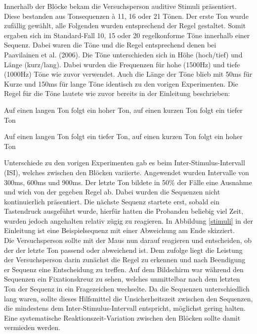 \documentclass[doc,a4paper,12pt]{apa6}
\begin{document}
Innerhalb der Blöcke bekam die Versuchsperson auditive Stimuli präsentiert. Diese bestanden aus Tonsequenzen à 11, 16 oder 21 Tönen. Der erste Ton wurde zufällig gewählt, alle Folgenden wurden entsprechend der Regel gestaltet. Somit ergaben sich im Standard-Fall 10, 15 oder 20 regelkonforme Töne innerhalb einer Sequenz. Dabei waren die Töne und die Regel entsprechend denen bei Paavilainen et al. (2006). Die Töne unterschieden sich in Höhe (hoch/tief) und Länge (kurz/lang). Dabei wurden die Frequenzen für hohe (1500Hz) und tiefe (1000Hz) Töne wie zuvor verwendet. Auch die Länge der Töne blieb mit 50ms für Kurze und 150ms für lange Töne identisch zu den vorigen Experimenten. Die Regel für die Töne lautete wie zuvor bereits in der Einleitung beschrieben:

\begin{compactitem}
  \item Auf einen langen Ton folgt ein hoher Ton, auf einen kurzen Ton folgt ein tiefer
Ton
  \item Auf einen langen Ton folgt ein tiefer Ton, auf einen kurzen Ton folgt ein hoher
Ton
\end{compactitem}

Unterschiede zu den vorigen Experimenten gab es beim Inter-Stimulus-Intervall (ISI), welches zwischen den Blöcken variierte. Angewendet wurden Intervalle von 300ms, 600ms und 900ms. Der letzte Ton bildete in 50\% der Fälle eine Ausnahme und wich von der gegeben Regel ab. Dabei wurden die Sequenzen nicht kontinuierlich präsentiert. Die nächste Sequenz startete erst, sobald ein Tastendruck ausgeführt wurde, hierfür hatten die Probanden beliebig viel Zeit, wurden jedoch angehalten relativ zügig zu reagieren. In Abbildung \ref{stimuli} in der Einleitung ist eine Beispielsequenz mit einer Abweichung am Ende skizziert.\\
Die Versuchsperson sollte mit der Maus nun darauf reagieren und entscheiden, ob der der letzte Ton passend oder abweichend ist. Dem zufolge liegt die Leistung der Versuchsperson darin zunächst die Regel zu erkennen und nach Beendigung er Sequenz eine Entscheidung zu treffen. Auf dem Bildschirm war während den Sequenzen ein Fixationskreuz zu sehen, welches unmittelbar nach dem letzten Ton der Sequenz in ein Fragezeichen wechselte. Da die Sequenzen unterschiedlich lang waren, sollte dieses Hilfsmittel die Unsicherheitszeit zwischen den Sequenzen, die mindestens dem Inter-Stimulus-Intervall entspricht, möglichst gering halten. Eine systematische Reaktionszeit-Variation zwischen den Blöcken sollte damit vermieden werden.
\end{document}
